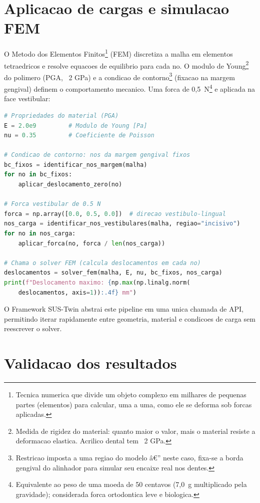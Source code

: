 \section{Aplicacao de cargas e simulacao FEM}

O Metodo dos Elementos Finitos\footnote{Tecnica numerica que divide um objeto
complexo em milhares de pequenas partes (elementos) para calcular, uma a uma,
como ele se deforma sob forcas aplicadas.} (FEM) discretiza a malha em
elementos tetraedricos e resolve equacoes de equilibrio para cada no.
O modulo de Young\footnote{Medida de rigidez do material: quanto maior o valor,
mais o material resiste a deformacao elastica. Acrilico dental tem ~2 GPa.}
do polimero (PGA, ~2 GPa) e a condicao de contorno\footnote{Restricao imposta
a uma regiao do modelo â€” neste caso, fixa-se a borda gengival do alinhador
para simular seu encaixe real nos dentes.} (fixacao na margem gengival)
definem o comportamento mecanico. Uma forca de 0,5~N\footnote{Equivalente ao
peso de uma moeda de 50 centavos (7,0~g multiplicado pela gravidade);
considerada forca ortodontica leve e biologica.} e aplicada na face vestibular:

\begin{lstlisting}[language=Python,caption={Pipeline FEM conceitual para
alinhador ortodÃ´ntico}]
# Propriedades do material (PGA)
E = 2.0e9         # Modulo de Young [Pa]
nu = 0.35         # Coeficiente de Poisson

# Condicao de contorno: nos da margem gengival fixos
bc_fixos = identificar_nos_margem(malha)
for no in bc_fixos:
    aplicar_deslocamento_zero(no)

# Forca vestibular de 0.5 N
forca = np.array([0.0, 0.5, 0.0])  # direcao vestibulo-lingual
nos_carga = identificar_nos_vestibulares(malha, regiao="incisivo")
for no in nos_carga:
    aplicar_forca(no, forca / len(nos_carga))

# Chama o solver FEM (calcula deslocamentos em cada no)
deslocamentos = solver_fem(malha, E, nu, bc_fixos, nos_carga)
print(f"Deslocamento maximo: {np.max(np.linalg.norm(
    deslocamentos, axis=1)):.4f} mm")
\end{lstlisting}

O Framework SUS-Twin abstrai este pipeline em uma unica chamada de API,
permitindo iterar rapidamente entre geometria, material e condicoes de carga
sem reescrever o solver.

\section{Validacao dos resultados}

